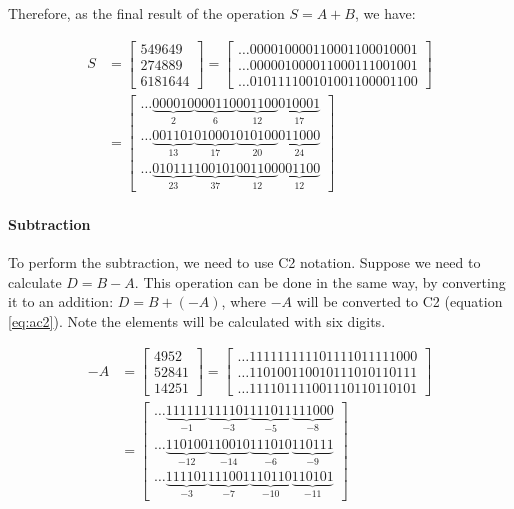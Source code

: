 \documentclass[12pt]{article}
\begin{document}
Therefore, as the final result of the operation $S= A + B$, we have:

\begin{align}
	S &=\begin{bmatrix}
	      549649\\ 
	      274889\\ 
	      6181644
	    \end{bmatrix}
        =
        \begin{bmatrix}
	    \ldots000010000110001100010001\\
	    \ldots000001000011000111001001\\
	    \ldots010111100101001100001100
	\end{bmatrix}
      \\ \nonumber      
      &=\begin{bmatrix}
  \ldots\underbrace{000010}_{2}\underbrace{000110}_{6}\underbrace{001100}_{12}
  \underbrace{010001}_{17}\\	
  \ldots\underbrace{001101}_{13}\underbrace{010001}_{17}\underbrace{010100}_{20}
  \underbrace{011000}_{24}\\
  \ldots\underbrace{010111}_{23}\underbrace{100101}_{37}\underbrace{001100}_{12}
  \underbrace{001100}_{12}
	\end{bmatrix}
\end{align}

\paragraph{Subtraction}
To perform the subtraction, we need to use C2 notation. Suppose  we need to
calculate $D = B - A$. This operation can be done in the same way, by
converting it to an addition: $D = B + (-A)$, where $-A$ will be converted to
C2 (equation \ref{eq:ac2}). Note the elements will be calculated with six
digits.

\begin{align}\label{eq:ac2}
	-A &= \begin{bmatrix}
		4952\\ 
		52841\\ 
		14251
	      \end{bmatrix} 
        =
        \begin{bmatrix}
	  \ldots111111111101111011111000\\ 
	  \ldots110100110010111010110111\\ 
	  \ldots111101111001110110110101
	\end{bmatrix}
        \\\nonumber
        &=\begin{bmatrix}
\ldots\underbrace{111111}_{-1}\underbrace{111101}_{-3}\underbrace{111011}_{-5}
\underbrace{111000}_{-8}\\
\ldots\underbrace{110100}_{-12}\underbrace{110010}_{-14}\underbrace{111010}_{-6}
\underbrace{110111}_{-9}\\
\ldots\underbrace{111101}_{-3}\underbrace{111001}_{-7}\underbrace{110110}_{-10}
\underbrace{110101}_{-11}
	  \end{bmatrix}
\end{align}
\end{document}
